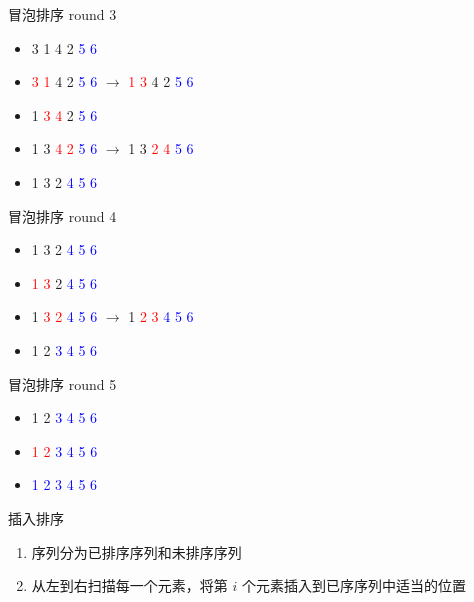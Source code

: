 \documentclass[aspectratio=169,xcolor=dvipsnames]{beamer}
\begin{document}
\begin{frame}{冒泡排序 round 3}
    \begin{itemize}
        \item 3 1 4 2 \textcolor{blue}{5 6}
        \item \textcolor{red}{3 1} 4 2 \textcolor{blue}{5 6} $\rightarrow$ \textcolor{red}{1 3} 4 2 \textcolor{blue}{5 6}
        \item 1 \textcolor{red}{3 4} 2 \textcolor{blue}{5 6}
        \item 1 3 \textcolor{red}{4 2} \textcolor{blue}{5 6} $\rightarrow$ 1 3 \textcolor{red}{2 4} \textcolor{blue}{5 6}
        \item 1 3 2 \textcolor{blue}{4 5 6}
    \end{itemize}
\end{frame}

\begin{frame}{冒泡排序 round 4}
    \begin{itemize}
        \item 1 3 2 \textcolor{blue}{4 5 6}
        \item \textcolor{red}{1 3} 2 \textcolor{blue}{4 5 6}
        \item 1 \textcolor{red}{3 2} \textcolor{blue}{4 5 6} $\rightarrow$ 1 \textcolor{red}{2 3} \textcolor{blue}{4 5 6}
        \item 1 2 \textcolor{blue}{3 4 5 6} 
    \end{itemize}
\end{frame}

\begin{frame}{冒泡排序 round 5}
    \begin{itemize}
        \item 1 2 \textcolor{blue}{3 4 5 6}
        \item \textcolor{red}{1 2} \textcolor{blue}{3 4 5 6}
        \item \textcolor{blue}{1 2 3 4 5 6}
    \end{itemize}
\end{frame}

\begin{frame}{插入排序}
    \begin{enumerate}
        \item 序列分为已排序序列和未排序序列
        \item 从左到右扫描每一个元素，将第 $i$ 个元素插入到已序序列中适当的位置
    \end{enumerate}
\end{frame}
\end{document}
